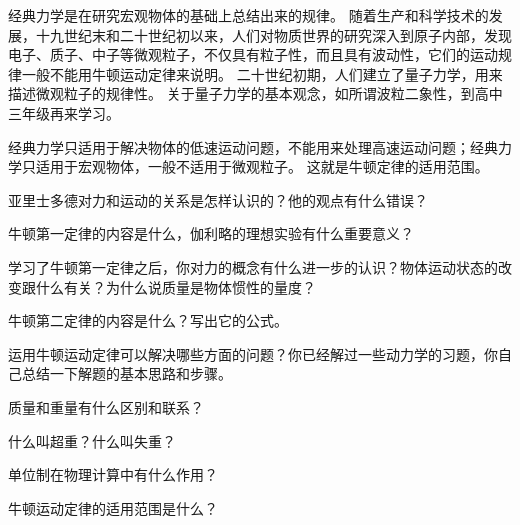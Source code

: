 经典力学是在研究宏观物体的基础上总结出来的规律。
随着生产和科学技术的发展，十九世纪末和二十世纪初以来，人们对物质世界的研究深入到原子内部，发现电子、质子、中子等微观粒子，不仅具有粒子性，而且具有波动性，它们的运动规律一般不能用牛顿运动定律来说明。
二十世纪初期，人们建立了量子力学，用来描述微观粒子的规律性。
关于量子力学的基本观念，如所谓波粒二象性，到高中三年级再来学习。

经典力学只适用于解决物体的低速运动问题，不能用来处理高速运动问题；经典力学只适用于宏观物体，一般不适用于微观粒子。
这就是牛顿定律的适用范围。

\begin{Review}
\begin{question}
  \item 亚里士多德对力和运动的关系是怎样认识的？他的观点有什么错误？
  \item 牛顿第一定律的内容是什么，伽利略的理想实验有什么重要意义？
  \item 学习了牛顿第一定律之后，你对力的概念有什么进一步的认识？物体运动状态的改变跟什么有关？为什么说质量是物体惯性的量度？
  \item 牛顿第二定律的内容是什么？写出它的公式。
  \item 运用牛顿运动定律可以解决哪些方面的问题？你已经解过一些动力学的习题，你自己总结一下解题的基本思路和步骤。
  \item 质量和重量有什么区别和联系？
  \item 什么叫超重？什么叫失重？
  \item 单位制在物理计算中有什么作用？
  \item 牛顿运动定律的适用范围是什么？
\end{question}
\end{Review}

